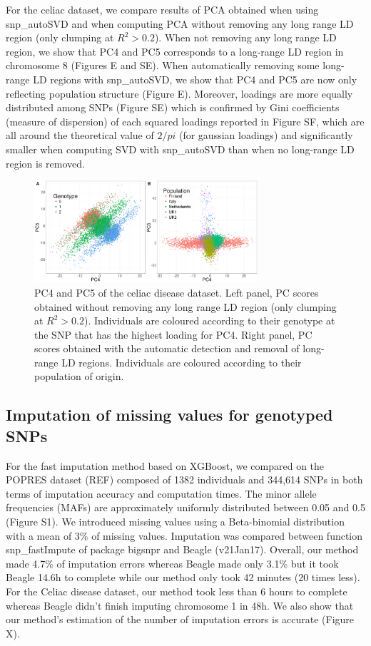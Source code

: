 \documentclass{bioinfo}
\begin{document}
For the celiac dataset, we compare results of PCA obtained when using snp\_autoSVD and when computing PCA without removing any long range LD region (only clumping at $R^2 > 0.2$). When not removing any long range LD region, we show that PC4 and PC5 corresponds to a long-range LD region in chromosome 8 (Figures E and SE). When automatically removing some long-range LD regions with snp\_autoSVD, we show that PC4 and PC5 are now only reflecting population structure (Figure E). Moreover, loadings are more equally distributed among SNPs (Figure SE) which is confirmed by Gini coefficients (measure of dispersion) of each squared loadings reported in Figure SF, which are all around the theoretical value of $2 / pi$ (for gaussian loadings) and significantly smaller when computing SVD with snp\_autoSVD than when no long-range LD region is removed.

\begin{figure}[!tpb]
\centerline{\includegraphics[width=235pt]{scores}}
\caption{PC4 and PC5 of the celiac disease dataset. Left panel, PC scores obtained without removing any long range LD region (only clumping at $R^2 > 0.2$). Individuals are coloured according to their genotype at the SNP that has the highest loading for PC4. Right panel, PC scores obtained with the automatic detection and removal of long-range LD regions. Individuals are coloured according to their population of origin.}\label{fig:scores}
\end{figure}

\subsection{Imputation of missing values for genotyped SNPs}\label{sec:impute}

For the fast imputation method based on XGBoost, we compared on the POPRES dataset (REF) composed of 1382 individuals and 344,614 SNPs in both terms of imputation accuracy and computation times. The minor allele frequencies (MAFs) are approximately uniformly distributed between 0.05 and 0.5 (Figure S1). We introduced missing values using a Beta-binomial distribution with a mean of 3\% of missing values. Imputation was compared between function snp\_fastImpute of package bigsnpr and Beagle (v21Jan17). Overall, our method made 4.7\% of imputation errors whereas Beagle made only 3.1\% but it took Beagle 14.6h to complete while our method only took 42 minutes (20 times less). For the Celiac disease dataset, our method took less than 6 hours to complete whereas Beagle didn't finish imputing chromosome 1 in 48h. We also show that our method's estimation of the number of imputation errors is accurate (Figure X).
\end{document}
